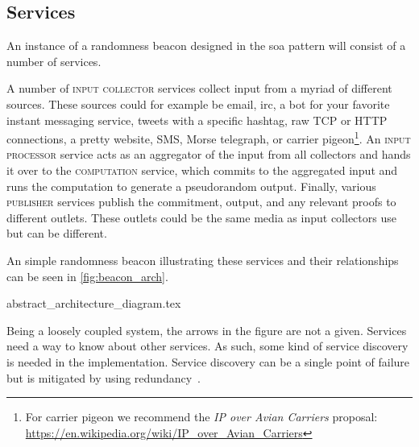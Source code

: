 \subsection{Services}%
\label{sub:components_of_a_beacon}

An instance of a randomness beacon designed in the \gls{soa} pattern will consist of a number of services.

A number of \textsc{input collector} services collect input from a myriad of different sources. These sources could for example be email, irc, a bot for your favorite instant messaging service, tweets with a specific hashtag, raw TCP or HTTP connections, a pretty website, SMS, Morse telegraph, or carrier pigeon\footnote{For carrier pigeon we recommend the \emph{IP over Avian Carriers} proposal: \url{https://en.wikipedia.org/wiki/IP_over_Avian_Carriers}}.
An \textsc{input processor} service acts as an aggregator of the input from all collectors and hands it over to the \textsc{computation} service, which commits to the aggregated input and runs the computation to generate a pseudorandom output.
Finally, various \textsc{publisher} services publish the commitment, output, and any relevant proofs to different outlets. These outlets could be the same media as input collectors use but can be different.

An simple randomness beacon illustrating these services and their relationships can be seen in \cref{fig:beacon_arch}.

{abstract_architecture_diagram.tex}

Being a loosely coupled system, the arrows in the figure are not a given. Services need a way to know about other services. As such, some kind of service discovery is needed in the implementation. Service discovery can be a single point of failure but is mitigated by using redundancy~\cite{soa_redundancy}.
